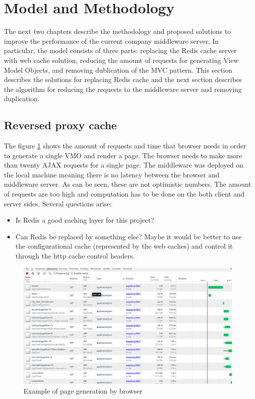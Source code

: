 \section{Model and Methodology}

The next two chapters describe the methodology and proposed solutions to improve the performance of the current company middleware server. In particular, the model consists of three parts: replacing the Redis cache server with web cache solution, reducing the amount of requests for generating View Model Objects, and removing dublication of the MVC pattern. This section describes the solutions for replacing Redis cache and the next section describes the algorithm for reducing the requests to the middleware server and removing duplication.

\subsection{Reversed proxy cache}

The figure \ref{fig:req_amount} shows the amount of requests and time that browser needs in order to generate a single VMO and  render a page. The browser needs to make more than twenty AJAX requests for a single page. The middleware was deployed on the local machine meaning there is no latency between the browser and middleware server. As can be seen, these are not optimistic numbers. The amount of requests are too high and computation has to be done on the both client and server sides. Several questions arise:
\begin{itemize}
	\item Is Redis a good caching layer for this project?
	\item Can Redis be replaced by something else? Maybe it would be better to use the configurational cache (represented by the web caches) and control it through the http cache control headers.
\end{itemize}


\begin{figure}[h]
    \centering
	\includegraphics[width=\textwidth]{images/amount_of_requests.png}
    \caption{Example of page generation by browser}
    \label{fig:req_amount}
\end{figure}


